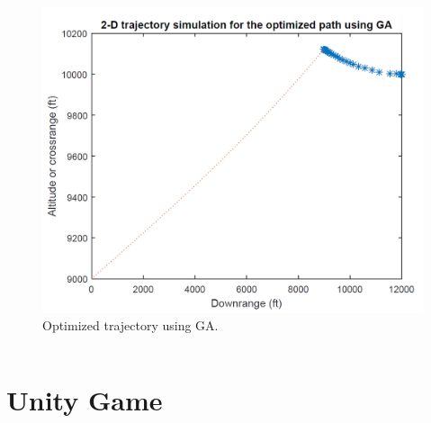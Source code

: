\documentclass{beamer}
\begin{document}
\begin{frame}
\begin{columns}[c]
	\begin{column}{.3\linewidth}
		\begin{figure}[H]
			\centering
			\includegraphics[scale = 0.18
			]{fig/polyTrajectory.PNG}
			\caption{Optimized trajectory using GA.}
			\label{GA poly trajectory}
		\end{figure}
	\end{column}
\end{columns}
\end{frame}

\section{Unity Game}

\end{document}
